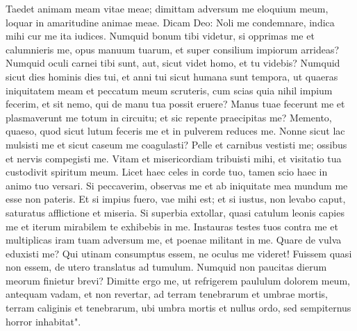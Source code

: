 \begin{biblechapter}  
\verse Taedet animam meam vitae meae; dimittam adversum me eloquium meum, loquar in amaritudine animae meae. 
\verse Dicam Deo: Noli me condemnare, indica mihi cur me ita iudices. 
\verse Numquid bonum tibi videtur, si opprimas me et calumnieris me, opus manuum tuarum, et super consilium impiorum arrideas? 
\verse Numquid oculi carnei tibi sunt, aut, sicut videt homo, et tu videbis? 
\verse Numquid sicut dies hominis dies tui, et anni tui sicut humana sunt tempora, 
\verse ut quaeras iniquitatem meam et peccatum meum scruteris, 
\verse cum scias quia nihil impium fecerim, et sit nemo, qui de manu tua possit eruere? 
\verse Manus tuae fecerunt me et plasmaverunt me totum in circuitu; et sic repente praecipitas me? 
\verse Memento, quaeso, quod sicut lutum feceris me et in pulverem reduces me. 
\verse Nonne sicut lac mulsisti me et sicut caseum me coagulasti? 
\verse Pelle et carnibus vestisti me; ossibus et nervis compegisti me. 
\verse Vitam et misericordiam tribuisti mihi, et visitatio tua custodivit spiritum meum. 
\verse Licet haec celes in corde tuo, tamen scio haec in animo tuo versari. 
\verse Si peccaverim, observas me et ab iniquitate mea mundum me esse non pateris. 
\verse Et si impius fuero, vae mihi est; et si iustus, non levabo caput, saturatus afflictione et miseria. 
\verse Si superbia extollar, quasi catulum leonis capies me et iterum mirabilem te exhibebis in me. 
\verse Instauras testes tuos contra me et multiplicas iram tuam adversum me, et poenae militant in me. 
\verse Quare de vulva eduxisti me? Qui utinam consumptus essem, ne oculus me videret! 
\verse Fuissem quasi non essem, de utero translatus ad tumulum. 
\verse Numquid non paucitas dierum meorum finietur brevi? Dimitte ergo me, ut refrigerem paululum dolorem meum, 
\verse antequam vadam, et non revertar, ad terram tenebrarum et umbrae mortis, 
\verse terram caliginis et tenebrarum, ubi umbra mortis et nullus ordo, sed sempiternus horror inhabitat". 
\end{biblechapter}


